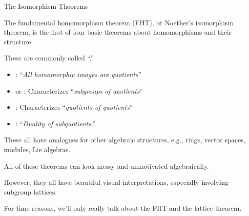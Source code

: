 \documentclass[8pt]{beamer}
\newcommand{\Pause}{}      %
\begin{document}
\begin{frame}{The Isomorphism Theorems}
  
  The fundamental homomorphism theorem (FHT), or Noether's isomorphism theorem, is the first of four
  basic theorems about homomorphisms and their structure. 
  
  \bigskip\Pause
  
  These are commonly called ``.''   \smallskip\Pause
  
  \begin{itemize}
  \item {}: ``\emph{All homomorphic images are quotients}''  \smallskip\Pause
  \item {} or : Characterizes ``\emph{subgroups of quotients}'' \smallskip\Pause
  \item {}: Characterizes ``\emph{quotients of quotients}'' \smallskip\Pause
  \item {}: ``\emph{Duality of subquotients}.'' \smallskip\Pause
  \end{itemize}
  
  These all have analogues for other algebraic structures, e.g.,
  rings, vector spaces, modules, Lie algebras.
  
  \bigskip\Pause
  
  All of these theorems can look messy and unmotivated algebraically.
  
  \bigskip\Pause
  
  However, they all have beautiful visual interpretations, especially
  involving subgroup lattices.

  \bigskip\Pause

  For time reasons, we'll only really talk about the FHT and the lattice theorem.
  
\end{frame}

\end{document}
